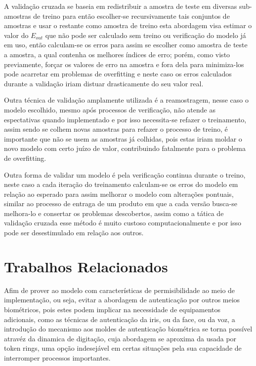 \documentclass[pfc]{imetex}
\begin{document}
    A validação cruzada se baseia em redistribuir a amostra de teste em diversas sub-amostras de treino para então escolher-se recursivamente tais conjuntos de amostras e usar o restante como amostra de treino esta abordagem visa estimar o valor do $E_{out}$ que não pode ser calculado sem treino ou verificação do modelo já em uso, então calculam-se os erros para assim se escolher como amostra de teste a amostra, a qual contenha os melhores índices de erro; porém, como visto previamente, forçar os valores de erro na amostra e fora dela para minimiza-los pode acarretar em problemas de overfitting e neste caso os erros calculados durante a validação iriam distuar drasticamente do seu valor real.

    Outra técnica de validação amplamente utilizada é a reamostragem, nesse caso o modelo escolhido, mesmo após processos de verificação, não atende as espectativas quando implementado e por isso necessita-se refazer o treinamento, assim sendo se colhem novas amostras para refazer o processo de treino, é importante que não se usem as amostras já colhidas, pois estas iriam moldar o novo modelo com certo juízo de valor, contribuindo fatalmente para o problema de overfitting.

    Outra forma de validar um modelo é pela verificação continua durante o treino, neste caso a cada iteração do treinamento calculam-se os erros  do modelo em relação ao esperado para assim melhorar o modelo com alterações pontuais, similar ao processo de entraga de um produto em que a cada versão busca-se melhora-lo e consertar os problemas descobertos, assim como a tática de validação cruzada esse método é muito custoso computacionalmente e por isso pode ser desestimulado em relação aos outros.
    
\label{fundamentaca}

\section{Trabalhos Relacionados}
Afim de prover ao modelo com características de permisibilidade ao meio de implementação, ou seja, evitar a abordagem de autenticação por outros meios biométricos, pois estes podem implicar na necessidade de equipamentos adicionais, como as técnicas de autenticação da iris\cite{IrisBiometricsResearch2013}, ou da face\cite{DeepFaceRecognition2015}, ou da voz\cite{SpeechRecognition}, a introdução do mecanismo aos moldes de autenticação biométrica se torna possível atravéz da dinamica de digitação, cuja abordagem se aproxima da usada por token rings, uma opção indesejável em certas situações pela sua capacidade de interromper processos importantes.
\end{document}
